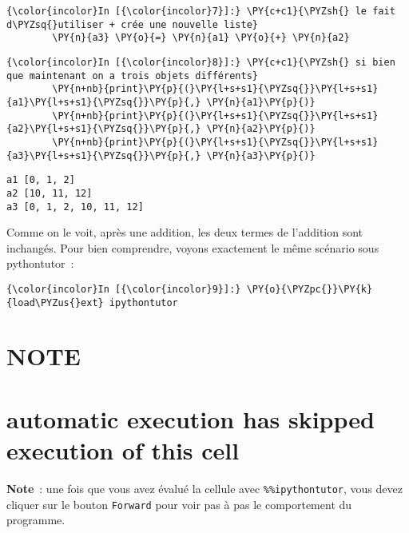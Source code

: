     \begin{Verbatim}[commandchars=\\\{\}]
{\color{incolor}In [{\color{incolor}7}]:} \PY{c+c1}{\PYZsh{} le fait d\PYZsq{}utiliser + crée une nouvelle liste}
        \PY{n}{a3} \PY{o}{=} \PY{n}{a1} \PY{o}{+} \PY{n}{a2}
\end{Verbatim}


    \begin{Verbatim}[commandchars=\\\{\}]
{\color{incolor}In [{\color{incolor}8}]:} \PY{c+c1}{\PYZsh{} si bien que maintenant on a trois objets différents}
        \PY{n+nb}{print}\PY{p}{(}\PY{l+s+s1}{\PYZsq{}}\PY{l+s+s1}{a1}\PY{l+s+s1}{\PYZsq{}}\PY{p}{,} \PY{n}{a1}\PY{p}{)}
        \PY{n+nb}{print}\PY{p}{(}\PY{l+s+s1}{\PYZsq{}}\PY{l+s+s1}{a2}\PY{l+s+s1}{\PYZsq{}}\PY{p}{,} \PY{n}{a2}\PY{p}{)}
        \PY{n+nb}{print}\PY{p}{(}\PY{l+s+s1}{\PYZsq{}}\PY{l+s+s1}{a3}\PY{l+s+s1}{\PYZsq{}}\PY{p}{,} \PY{n}{a3}\PY{p}{)}
\end{Verbatim}


    \begin{Verbatim}[commandchars=\\\{\}]
a1 [0, 1, 2]
a2 [10, 11, 12]
a3 [0, 1, 2, 10, 11, 12]

    \end{Verbatim}

    Comme on le voit, après une addition, les deux termes de l'addition sont
inchangés. Pour bien comprendre, voyons exactement le même scénario sous
pythontutor~:

    \begin{Verbatim}[commandchars=\\\{\}]
{\color{incolor}In [{\color{incolor}9}]:} \PY{o}{\PYZpc{}}\PY{k}{load\PYZus{}ext} ipythontutor
\end{Verbatim}


    \hypertarget{note}{%
\section{NOTE}\label{note}}

\hypertarget{automatic-execution-has-skipped-execution-of-this-cell}{%
\section{automatic execution has skipped execution of this
cell}\label{automatic-execution-has-skipped-execution-of-this-cell}}

\textbf{Note}~: une fois que vous avez évalué la cellule avec
\texttt{\%\%ipythontutor}, vous devez cliquer sur le bouton
\texttt{Forward} pour voir pas à pas le comportement du programme.

